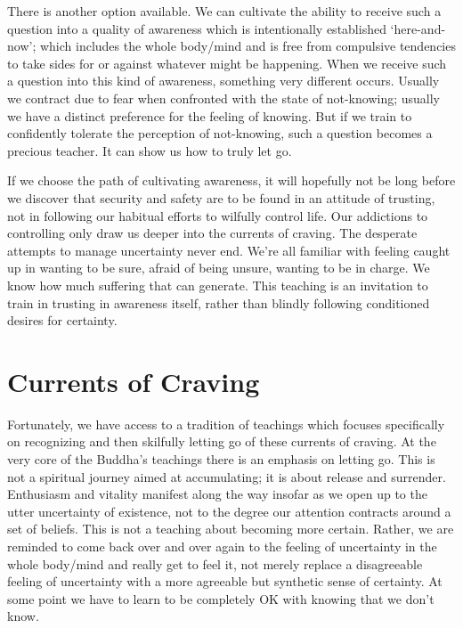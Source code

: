 There is another option available. We can cultivate the ability to
receive such a question into a quality of awareness which is
intentionally established ‘here-and-now’; which includes the whole
body/mind and is free from compulsive tendencies to take sides for or
against whatever might be happening. When we receive such a question
into this kind of awareness, something very different occurs. Usually we
contract due to fear when confronted with the state of
not-knowing; usually we have a distinct preference for the feeling of
knowing. But if we train to confidently tolerate the perception of
not-knowing, such a question becomes a precious teacher. It can show us
how to truly let go.

If we choose the path of cultivating awareness, it will hopefully not be
long before we discover that security and safety are to be found in an
attitude of trusting, not in following our habitual efforts to wilfully
control life. Our addictions to controlling only draw us deeper into the
currents of craving. The desperate attempts to manage uncertainty never
end. We’re all familiar with feeling caught up in wanting to be sure,
afraid of being unsure, wanting to be in charge. We know how much
suffering that can generate. This teaching is an invitation to train in
trusting in awareness itself, rather than blindly following conditioned
desires for certainty.

\section{Currents of Craving}

Fortunately, we have access to a tradition of teachings which focuses
specifically on recognizing and then skilfully letting go of these
currents of craving. At the very core of the Buddha’s teachings there is
an emphasis on letting go. This is not a spiritual journey aimed at
accumulating; it is about release and surrender. Enthusiasm and vitality
manifest along the way insofar as we open up to the utter uncertainty of
existence, not to the degree our attention contracts around a set of
beliefs. This is not a teaching about becoming more certain. Rather, we
are reminded to come back over and over again to the feeling of
uncertainty in the whole body/mind and really get to feel it, not merely
replace a disagreeable feeling of uncertainty with a more agreeable but
synthetic sense of certainty. At some point we have to learn to be
completely OK with knowing that we don’t know.

